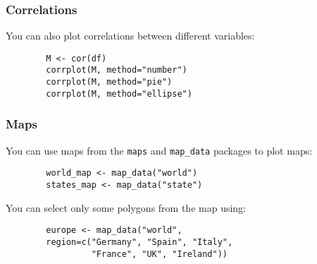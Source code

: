 \documentclass{beamer}
\begin{document}
	\begin{frame}[fragile]
		\frametitle{Correlations}

		You can also plot correlations between different variables:

		\vspace{2em}
	
		\begin{exampleblock}{}
		\begin{BVerbatim}
		M <- cor(df)
		corrplot(M, method="number")
		corrplot(M, method="pie")
		corrplot(M, method="ellipse")
		\end{BVerbatim}
		\end{exampleblock}{}

	\end{frame}

	\begin{frame}[fragile]
		\frametitle{Maps}

		You can use maps from the \verb|maps| and \verb|map_data| packages to plot maps:

		\vspace{1em}
	
		\begin{exampleblock}{}
		\begin{BVerbatim}
		world_map <- map_data("world")
		states_map <- map_data("state")
		\end{BVerbatim}
		\end{exampleblock}{}

		\vspace{1em}

		You can select only some polygons from the map using:

		\vspace{1em}

		\begin{exampleblock}{}
		\begin{BVerbatim}
		europe <- map_data("world",
		region=c("Germany", "Spain", "Italy",
		         "France", "UK", "Ireland")) 
		\end{BVerbatim}
		\end{exampleblock}{}

	\end{frame}
\end{document}
